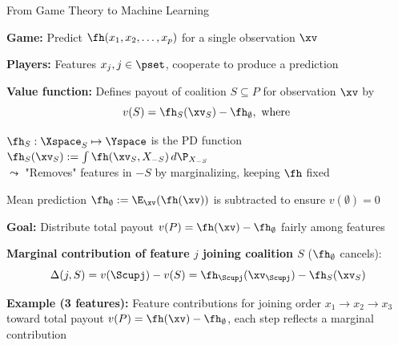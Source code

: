 \documentclass[10pt,compress,t,notes=noshow, xcolor=table]{beamer}
\begin{document}
\begin{framev}[fs=small,align=top]{From Game Theory to Machine Learning}
\begin{itemizeS}
\item \textbf{Game:} Predict $\fh(x_1, x_2, \ldots, x_p)$ for a single observation $\xv$
\item \textbf{Players:} Features $x_j, j \in \pset$, cooperate to produce a prediction
\item \textbf{Value function:} Defines payout of coalition $S \subseteq P$ for observation $\xv$ by
$$
v(S) = \fh_S(\xv_S) - \fh_{\emptyset}, \text{ where }
$$
\begin{itemizeS}
\item $\fh_S: \Xspace_S \mapsto \Yspace$ is the PD function
$\fh_S(\xv_S) := \int \fh(\xv_S, X_{-S}) \, d\P_{X_{-S}}$\\
$\leadsto$ "Removes" features in $-S$ by marginalizing, keeping $\fh$ fixed
\item Mean prediction $\fh_{\emptyset} := \E_{\xv}(\fh(\xv))$ is subtracted to ensure $v(\emptyset) = 0$
\end{itemizeS}
\item \textbf{Goal:} Distribute total payout $v(P) = \fh(\xv) - \fh_\emptyset$ fairly among features%
\pause
\item \textbf{Marginal contribution of feature $j$ joining coalition $S$} ($\fh_{\emptyset}$ cancels):
$$
\Delta(j, S) = v(\Scupj) - v(S) = \fh_{\Scupj}(\xv_{\Scupj}) - \fh_S(\xv_S)
$$
\item %
\textbf{Example (3 features):} Feature contributions for joining order $x_1 \rightarrow x_2 \rightarrow x_3$ toward total payout $v(P) = \fh(\xv) - \fh_\emptyset$, each step reflects a marginal contribution
\resizebox{0.9\linewidth}{!}{
\begin{tikzpicture}[
dot/.style = {circle, fill, inner sep=2pt},
arrow/.style = {-stealth, gray, semithick}
]

\end{tikzpicture}}
\end{itemizeS}
\end{framev}
\end{document}
